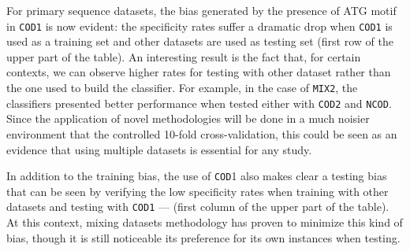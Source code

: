 \documentclass[runningheads,a4paper]{llncs}
\begin{document}
For primary sequence datasets, the bias generated by the presence of ATG motif in {\tt COD1} is now evident:  the specificity rates suffer a dramatic drop when {\tt COD1} is used as a training set and other datasets are used as testing set (first row of the upper part of the table). An interesting result is the fact that, for certain contexts, we can observe higher rates for testing with other dataset rather than the one used to build the classifier. For example, in the case of {\tt MIX2}, the classifiers presented better performance when tested either with {\tt COD2} and {\tt NCOD}. Since the application of novel methodologies will be done in a much noisier environment that the controlled 10-fold cross-validation, this could be seen as an evidence  that using multiple datasets is essential for any study.

In addition to the training bias, the use  of {\tt COD}1 also makes clear a testing bias that can be seen by verifying the low specificity rates when training with other datasets and testing with {\tt COD1} --- (first column of the upper part of the table). At this context, mixing datasets methodology has proven to minimize  this kind of bias, though  it is still noticeable its preference for its own instances when testing.
\end{document}
